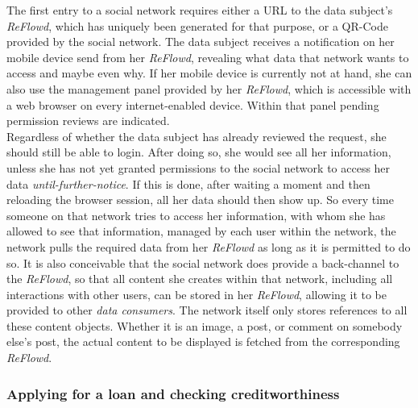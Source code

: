 \documentclass[12pt,english,a4paper,titlepage,cleardoublepage=empty,dottedtoc]{report}
\begin{document}
The first entry to a social network requires either a URL to the data
subject's \emph{ReFlowd}, which has uniquely been generated for that
purpose, or a QR-Code provided by the social network. The data subject
receives a notification on her mobile device send from her
\emph{ReFlowd}, revealing what data that network wants to access and
maybe even why. If her mobile device is currently not at hand, she can
also use the management panel provided by her \emph{ReFlowd}, which is
accessible with a web browser on every internet-enabled device. Within
that panel pending permission reviews are indicated.\\
Regardless of whether the data subject has already reviewed the request,
she should still be able to login. After doing so, she would see all her
information, unless she has not yet granted permissions to the social
network to access her data \emph{until-further-notice}. If this is done,
after waiting a moment and then reloading the browser session, all her
data should then show up. So every time someone on that network tries to
access her information, with whom she has allowed to see that
information, managed by each user within the network, the network pulls
the required data from her \emph{ReFlowd} as long as it is permitted to
do so. It is also conceivable that the social network does provide a
back-channel to the \emph{ReFlowd}, so that all content she creates
within that network, including all interactions with other users, can be
stored in her \emph{ReFlowd}, allowing it to be provided to other
\emph{data consumers}. The network itself only stores references to all
these content objects. Whether it is an image, a post, or comment on
somebody else's post, the actual content to be displayed is fetched from
the corresponding \emph{ReFlowd}.

\subsubsection*{Applying for a loan and checking
creditworthiness}\label{applying-for-a-loan-and-checking-creditworthiness}
\end{document}
